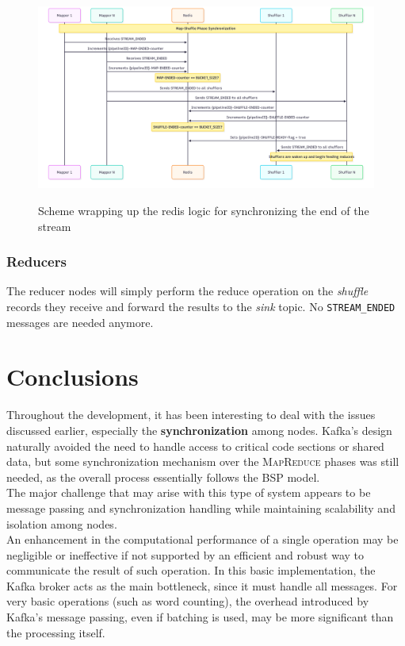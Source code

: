 \newpage
\begin{figure}[htbp]
   \centering
   \caption{Scheme wrapping up the redis logic for synchronizing the end of the stream}
   \includegraphics[width=\columnwidth]{images/redisSynch.png}
   \label{fig:redisSynch}
\end{figure}

\subsubsection{Reducers}
The reducer nodes will simply perform the reduce operation on the \textit{shuffle} records they receive and forward the results to the \textit{sink} topic.
No \lstinline|STREAM_ENDED| messages are needed anymore.


\section{Conclusions}

Throughout the development, it has been interesting to deal with the issues discussed earlier, especially the \textbf{synchronization} among nodes. Kafka's design naturally avoided the need to handle access to critical code sections or shared data, but some synchronization mechanism over the \textsc{MapReduce} phases was still needed, as the overall process essentially follows the \textsc{BSP} model.\\
The major challenge that may arise with this type of system appears to be message passing and synchronization handling while maintaining scalability and isolation among nodes.\\
An enhancement in the computational performance of a single operation may be negligible or ineffective if not supported by an efficient and robust way to communicate the result of such operation.
In this basic implementation, the Kafka broker acts as the main bottleneck, since it must handle all messages. For very basic operations (such as word counting), the overhead introduced by Kafka's message passing, even if batching is used, may be more significant than the processing itself.

